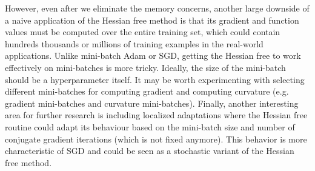 \documentclass[10pt,twocolumn,letterpaper]{article}
\begin{document}
However, even after we eliminate the memory concerns, another large downside of a naive application of the Hessian free method is that its gradient and function values must be computed over the entire training set, which could contain hundreds thousands or millions of training examples in the real-world applications. Unlike mini-batch Adam or SGD, getting the Hessian free to work effectively on mini-batches is more tricky. Ideally, the size of the mini-batch should be a hyperparameter itself. It may be worth experimenting with selecting different mini-batches for computing gradient and computing curvature (e.g. gradient mini-batches and curvature mini-batches). Finally, another interesting area for further research is including localized adaptations where the Hessian free routine could adapt its behaviour based on the mini-batch size and number of conjugate gradient iterations (which is not fixed anymore). This behavior is more characteristic of SGD and could be seen as a stochastic variant of the Hessian free method.




   
{\small

}
\end{document}

